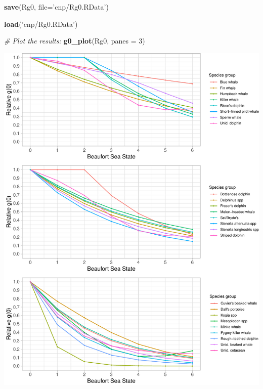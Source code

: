 \documentclass[
]{book}
\newenvironment{Shaded}{\begin{snugshade}}{\end{snugshade}}
\newcommand{\CommentTok}[1]{\textcolor[rgb]{0.56,0.35,0.01}{\textit{#1}}}
\newcommand{\DataTypeTok}[1]{\textcolor[rgb]{0.13,0.29,0.53}{#1}}
\newcommand{\DecValTok}[1]{\textcolor[rgb]{0.00,0.00,0.81}{#1}}
\newcommand{\KeywordTok}[1]{\textcolor[rgb]{0.13,0.29,0.53}{\textbf{#1}}}
\newcommand{\NormalTok}[1]{#1}
\newcommand{\StringTok}[1]{\textcolor[rgb]{0.31,0.60,0.02}{#1}}
\begin{document}
\begin{Shaded}
\begin{Highlighting}[]
\KeywordTok{save}\NormalTok{(Rg0, }\DataTypeTok{file=}\StringTok{'cnp/Rg0.RData'}\NormalTok{)}
\end{Highlighting}
\end{Shaded}

\begin{Shaded}
\begin{Highlighting}[]
\KeywordTok{load}\NormalTok{(}\StringTok{'cnp/Rg0.RData'}\NormalTok{)}
\end{Highlighting}
\end{Shaded}

\begin{Shaded}
\begin{Highlighting}[]
\CommentTok{# Plot the results: }
\KeywordTok{g0_plot}\NormalTok{(Rg0, }\DataTypeTok{panes =} \DecValTok{3}\NormalTok{)}
\end{Highlighting}
\end{Shaded}

\includegraphics{figures/unnamed-chunk-321-1.pdf}
\end{document}
